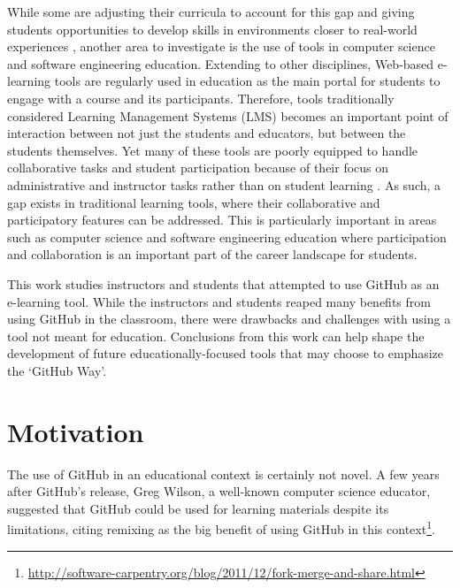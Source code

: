 While some are adjusting their curricula to account for this gap \cite{jazayeri2004education} and giving students opportunities to develop skills in environments closer to real-world experiences \cite{coleman2012collaboration}, another area to investigate is the use of tools in computer science and software engineering education. Extending to other disciplines, Web-based e-learning tools are regularly used in education as the main portal for students to engage with a course and its participants. Therefore, tools traditionally considered Learning Management Systems (LMS) becomes an important point of interaction between not just the students and educators, but between the students themselves. Yet many of these tools are poorly equipped to handle collaborative tasks and student participation because of their focus on administrative and instructor tasks rather than on student learning \cite{mcloughlin2007social}. As such, a gap exists in traditional learning tools, where their collaborative and participatory features can be addressed. This is particularly important in areas such as computer science and software engineering education where participation and collaboration is an important part of the career landscape for students.


This work studies instructors and students that attempted to use GitHub as an e-learning tool. While the instructors and students reaped many benefits from using GitHub in the classroom, there were drawbacks and challenges with using a tool not meant for education. Conclusions from this work can help shape the development of future educationally-focused tools that may choose to emphasize the `GitHub Way'.

\section{Motivation}
The use of GitHub in an educational context is certainly not novel. A few years after GitHub's release, Greg Wilson, a well-known computer science educator, suggested that GitHub could be used for learning materials despite its limitations, citing remixing as the big benefit of using GitHub in this context\footnote{\url{http://software-carpentry.org/blog/2011/12/fork-merge-and-share.html}}.

